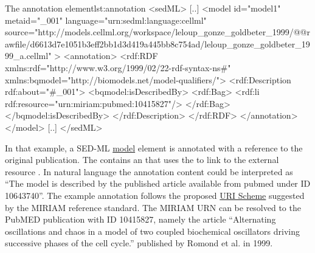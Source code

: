 

\begin{myXmlLst}{The annotation element}{lst:annotation}
<sedML>
	[..]
	<model id="model1" metaid="_001" language="urn:sedml:language:cellml" source="http://models.cellml.org/workspace/leloup_gonze_goldbeter_1999/@@rawfile/d6613d7e1051b3eff2bb1d3d419a445bb8c754ad/leloup_gonze_goldbeter_1999_a.cellml" >
		<annotation>
    		<rdf:RDF xmlns:rdf="http://www.w3.org/1999/02/22-rdf-syntax-ns#" xmlns:bqmodel="http://biomodels.net/model-qualifiers/">
				<rdf:Description rdf:about="#_001">
				<bqmodel:isDescribedBy>
				<rdf:Bag>
					<rdf:li rdf:resource="urn:miriam:pubmed:10415827"/>
				</rdf:Bag>
				</bqmodel:isDescribedBy>
    			</rdf:Description>
			</rdf:RDF>
		</annotation>
	</model>
	[..]
</sedML>
\end{myXmlLst}

In that example, a SED-ML \hyperref[class:model]{model} element is annotated with a reference to the original publication. The  contains an  that uses the   to link to the external resource . In natural language the annotation content could be interpreted as ``The model is described by the published article available from pubmed under ID 10643740''. The example annotation follows the proposed \hyperref[sec:uriScheme]{URI Scheme} suggested by the MIRIAM reference standard. The MIRIAM URN can be resolved to the PubMED publication with ID 10415827, namely the article ``Alternating oscillations and chaos in a model of two coupled biochemical oscillators driving successive phases of the cell cycle.'' published by Romond et al. in  1999.


